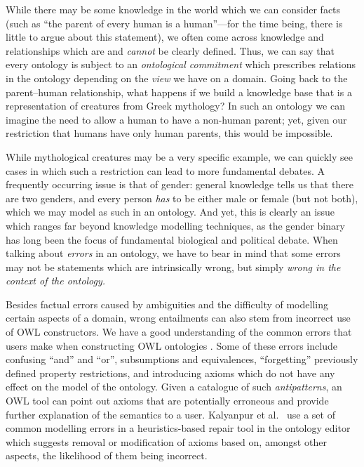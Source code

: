 While there may be some knowledge in the world which we can consider facts (such as \enquote{the parent of every human is a human}---for the time being, there is little to argue about this statement), we often come across knowledge and relationships which are and \emph{cannot} be clearly defined. Thus, we can say that every ontology is subject to an \emph{ontological commitment} which prescribes relations in the ontology depending on the \emph{view} we have on a domain. Going back to the parent--human relationship, what happens if we build a knowledge base that is a representation of creatures from Greek mythology? In such an ontology we can imagine the need to allow a human to have a non-human parent; yet, given our restriction that humans have only human parents, this would be impossible. 

While mythological creatures may be a very specific example, we can quickly see cases in which such a restriction can lead to more fundamental debates. A frequently occurring issue is that of gender: general knowledge tells us that there are two genders, and every person \emph{has} to be either male or female (but not both), which we may model as such in an ontology. And yet, this is clearly an issue which ranges far beyond knowledge modelling techniques, as the gender binary has long been the focus of fundamental biological and political debate. When talking about \emph{errors} in an ontology, we have to bear in mind that some errors may not be statements which are intrinsically wrong, but simply \emph{wrong in the context of the ontology.}

Besides factual errors caused by ambiguities and the difficulty of modelling certain aspects of a domain, wrong entailments can also stem from incorrect use of OWL constructors. We have a good understanding of the common errors that users make when constructing OWL ontologies \cite{rector04aa,kalyanpur06bh,roussey09ab}. Some of these errors include confusing \enquote{and} and \enquote{or}, subsumptions and equivalences, \enquote{forgetting} previously defined property restrictions, and introducing axioms which do not have any effect on the model of the ontology. Given a catalogue of such \emph{antipatterns}, an OWL tool can point out axioms that are potentially erroneous and provide further explanation of the semantics to a user. Kalyanpur et al.\ \cite{kalyanpur06bh} use a set of common modelling errors in a heuristics-based repair tool in the \swoop ontology editor which suggests removal or modification of axioms based on, amongst other aspects, the likelihood of them being incorrect.

